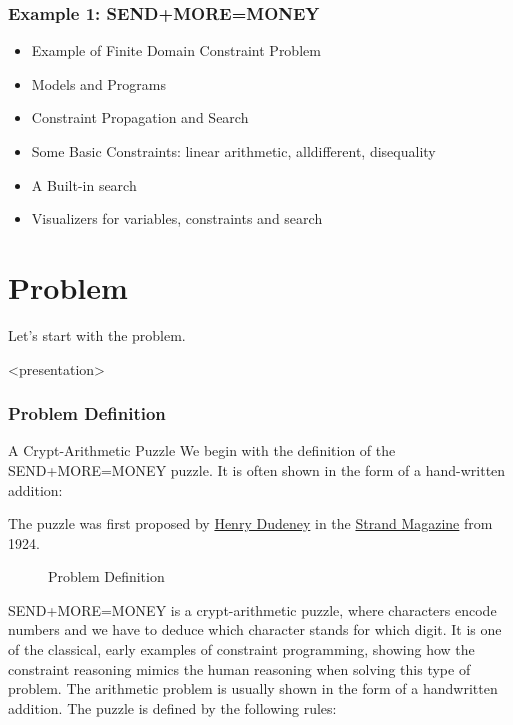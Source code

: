 \begin{frame}
\frametitle{Example 1: SEND+MORE=MONEY}
\begin{itemize}
\item Example of Finite Domain Constraint Problem
\item Models and Programs
\item Constraint Propagation and Search
\item Some Basic Constraints: linear arithmetic, alldifferent, disequality
\item A Built-in search
\item Visualizers for variables, constraints and search
\end{itemize}
\end{frame}


\section{Problem}
Let's start with the problem.

\begin{frame}<presentation>
\frametitle{Problem Definition}
\begin{block}{A Crypt-Arithmetic Puzzle}
We begin with the definition of the SEND+MORE=MONEY puzzle. It is often shown in the form of a hand-written addition:
\end{block}
\begin{center}

\end{center}
{\small The puzzle was first proposed by \href{https://en.wikipedia.org/wiki/Henry_Dudeney}{Henry Dudeney} in the \href{https://en.wikipedia.org/wiki/The_Strand_Magazine}{Strand Magazine} from 1924.} 
\end{frame}

\begin{figure}[ht]
\caption{\label{sendmore:problem}Problem Definition}
\begin{center}

\end{center}
\end{figure}



SEND+MORE=MONEY is a crypt-arithmetic puzzle, where characters encode numbers and we have to deduce which character stands for which digit. It is one of the classical, early examples of constraint programming, showing how the constraint reasoning mimics the human reasoning when solving this type of problem. The arithmetic problem is usually shown in the form of a handwritten addition. The puzzle is defined by the following rules:


